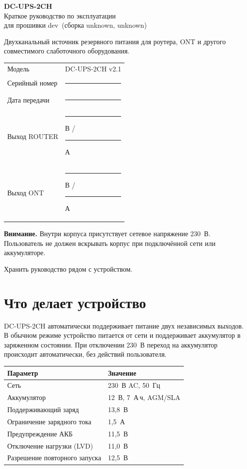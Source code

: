 \documentclass[10.5pt,a5paper]{article}
\newcommand{\hwversion}{v2.1}%
\newcommand{\fwversion}{dev}%
\newcommand{\builddate}{unknown}%
\newcommand{\buildcommit}{unknown}%
\begin{document}
\begin{titlepage}
\centering
\vspace*{10mm}
{\sffamily\bfseries\fontsize{24}{28}\selectfont DC-UPS-2CH\\[2mm]}
{\sffamily\Large Краткое руководство по эксплуатации\\[5mm]}
{\sffamily\small для прошивки \fwversion\ (сборка \buildcommit, \builddate)}

\vspace{9mm}
\begin{infobox}
\centering
Двухканальный источник резервного питания для роутера, ONT и другого совместимого слаботочного оборудования.
\end{infobox}

\vspace{7mm}
\begin{tabularx}{\textwidth}{@{}lX@{}}
\toprule
Модель & DC-UPS-2CH \hwversion \\
Серийный номер & \rule{45mm}{0.4pt} \\
Дата передачи & \rule{45mm}{0.4pt} \\
Выход ROUTER & \rule{18mm}{0.4pt} В / \rule{18mm}{0.4pt} А \\
Выход ONT & \rule{18mm}{0.4pt} В / \rule{18mm}{0.4pt} А \\
\bottomrule
\end{tabularx}

\vfill
\begin{warnbox}
\textbf{Внимание.} Внутри корпуса присутствует сетевое напряжение 230~В. Пользователь не должен вскрывать корпус при подключённой сети или аккумуляторе.
\end{warnbox}
\vfill
{\small Хранить руководство рядом с устройством.}
\end{titlepage}

\section{Что делает устройство}

DC-UPS-2CH автоматически поддерживает питание двух независимых выходов. В обычном режиме устройство питается от сети и поддерживает аккумулятор в заряженном состоянии. При отключении 230~В переход на аккумулятор происходит автоматически, без действий пользователя.

\begin{tabularx}{\textwidth}{@{}p{44mm}X@{}}
\toprule
\textbf{Параметр} & \textbf{Значение} \\
\midrule
Сеть & 230~В AC, 50~Гц \\
Аккумулятор & 12~В, 7~А\,ч, AGM/SLA \\
Поддерживающий заряд & 13,8~В \\
Ограничение зарядного тока & 1,5~А \\
Предупреждение АКБ & 11,5~В \\
Отключение нагрузки (LVD) & 11,0~В \\
Разрешение повторного запуска & 12,5~В \\
\bottomrule
\end{tabularx}
\end{document}
